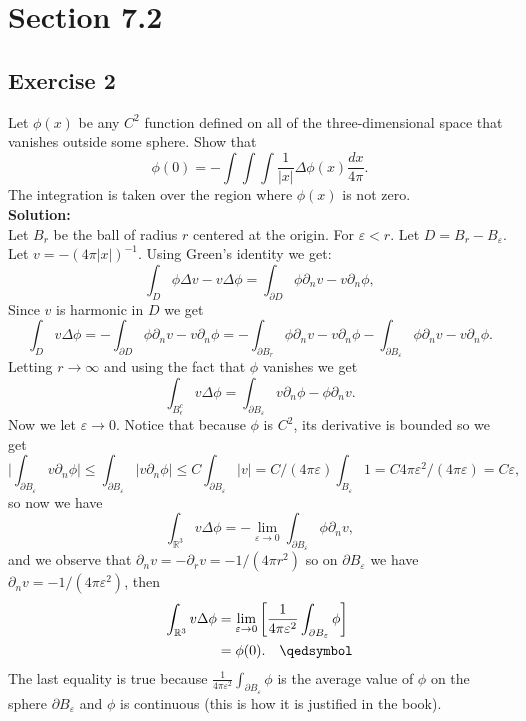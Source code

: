 \documentclass[12pt]{article}%
\begin{document}
\section*{Section 7.2}
\subsection*{Exercise 2}
Let $\phi(x)$ be any $C^2$ function defined on all of the three-dimensional
space that vanishes outside some sphere. Show that
\[
    \phi(0)=-\int\int\int \frac{1}{|x|}\Delta \phi(x) \frac{dx}{4\pi}.
\]
The integration is taken over the region where $\phi(x)$ is not zero.\\
\textbf{Solution:}\\
Let $B_r$ be the ball of radius $r$ centered at the origin. For
$\varepsilon<r$. Let $D=B_r-B_\varepsilon$.\\
Let $v=-(4\pi|x|)^{-1}$. Using Green's identity we get:
\[
    \int_D \phi\Delta v  - v \Delta \phi = \int_{\partial D} \phi \partial_n v
    - v \partial_n \phi,
\]
Since $v$ is harmonic in $D$ we get
\[
    \int_D v \Delta \phi = -\int_{\partial D} \phi \partial_n v - v \partial_n \phi = -
    \int_{\partial B_r} \phi \partial_n v - v \partial_n \phi - \int_{\partial
    B_\varepsilon} \phi \partial_n v - v \partial_n \phi.
\]
Letting $r\to \infty$ and using the fact that $\phi$ vanishes we get
\[
    \int_{B_\epsilon^c}v\Delta\phi = \int_{\partial B_\varepsilon}
    v\partial_n \phi - \phi \partial_n v.
\]
Now we let $\varepsilon \to 0$. Notice that because $\phi$ is $C^2$, its
derivative is bounded so we get
\[
    \bigg| \int_{\partial B_\varepsilon} v\partial_n \phi\bigg|
    \leq \int_{\partial B_\varepsilon} |v\partial_n \phi|
    \leq C \int_{\partial B_\varepsilon}|v| =
    C/(4\pi\varepsilon)\int_{B_\varepsilon}1=C4\pi\varepsilon^2/(4\pi\varepsilon)
    = C\varepsilon,
\]
so now we have
\[
    \int_{\mathbb{R}^3}v\Delta\phi = -\lim_{\varepsilon\to0}\int_{\partial B_\varepsilon}\phi\partial_n v,
\]
and we observe that $\partial_n v=-\partial_r v= -1/(4\pi r^2)$ so on
$\partial B_\varepsilon$ we have $\partial_n v = -1/(4\pi\varepsilon^2)$, then
\begin{align*}
    \int_{\mathbb{R}^3}v\Delta\phi &=
    \lim_{\varepsilon\to0}\left[\frac{1}{4\pi\varepsilon^2}\int_{\partial
    B_\varepsilon}\phi\right]\\
    &=\phi(0). \quad \qedsymbol
\end{align*}
The last equality is true because $\frac{1}{4\pi
\varepsilon^2}\int_{\partial B_\varepsilon}\phi$ is the average value of $\phi$
on the sphere $\partial B_\varepsilon$ and $\phi$ is continuous (this is how it
is justified in the book).
\end{document}
